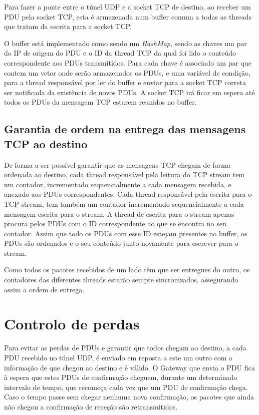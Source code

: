 \documentclass[a4paper]{report}
\begin{document}
Para fazer a ponte entre o túnel UDP e a socket TCP de destino, ao receber
um PDU pela socket TCP, esta é armazenada num buffer comum a todas as threads
que tratam da escrita para a socket TCP.

O buffer está implementado como sendo um \textit{HashMap}, sendo as chaves um 
par do IP de origem do PDU e o ID da thread TCP da qual foi lido o conteúdo 
correspondente aos PDUs transmitidos. Para cada chave é associado um par que
contem um vetor onde serão armazenados os PDUs, e uma variável de condição,
para a thread responsável por ler do buffer e enviar para a socket TCP correta
ser notificada da existência de novos PDUs. A socket TCP irá ficar em espera
até todos os PDUs da mensagem TCP estarem reunidos no buffer.

\subsection{Garantia de ordem na entrega das mensagens TCP ao destino}

De forma a ser possível garantir que as mensagens TCP chegam de forma ordenada
ao destino, cada thread responsável pela leitura do TCP stream tem um contador,
incrementado sequencialmente a cada mensagem recebida, e anexado aos PDUs
correspondentes. Cada thread responsável pela escrita para o TCP stream, tem
também um contador incrementado sequencialmente a cada mensagem escrita para o
stream. A thread de escrita para o stream apenas procura pelos PDUs com o ID
correspondente ao que se encontra no seu contador. Assim que todo os PDUs com 
esse ID estejam presentes no buffer, os PDUs são ordenados e o seu conteúdo
junto novamente para escrever para o stream.

Como todos os pacotes recebidos de um lado têm que ser entregues do outro,
os contadores das diferentes threads estarão sempre sincronizados, assegurando
assim a ordem de entrega.

\section{Controlo de perdas}

Para evitar as perdas de PDUs e garantir que todos chegam ao destino, a cada 
PDU recebido no túnel UDP, é enviado em reposta a este um outro com a
informação de que chegou ao destino e é válido. O Gateway que envia o PDU
fica à espera que estes PDUs de confirmação cheguem, durante um determinado
intervalo de tempo, que recomeça cada vez que um PDU de confirmação chega.
Caso o tempo passe sem chegar nenhuma nova confirmação, os pacotes que ainda
não chegou a confirmação de receção são retransmitidos.
\end{document}
